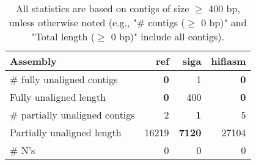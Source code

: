 \documentclass[12pt,a4paper]{article}
\begin{document}
\begin{table}[ht]
\begin{center}
\caption{All statistics are based on contigs of size $\geq$ 400 bp, unless otherwise noted (e.g., "\# contigs ($\geq$ 0 bp)" and "Total length ($\geq$ 0 bp)" include all contigs).}
\begin{tabular}{|l*{3}{|r}|}
\hline
Assembly & ref & siga & hifiasm \\ \hline
\# fully unaligned contigs & {\bf 0} & 1 & {\bf 0} \\ \hline
Fully unaligned length & {\bf 0} & 400 & {\bf 0} \\ \hline
\# partially unaligned contigs & 2 & {\bf 1} & 5 \\ \hline
Partially unaligned length & 16219 & {\bf 7120} & 27104 \\ \hline
\# N's & 0 & 0 & 0 \\ \hline
\end{tabular}
\end{center}
\end{table}
\end{document}
